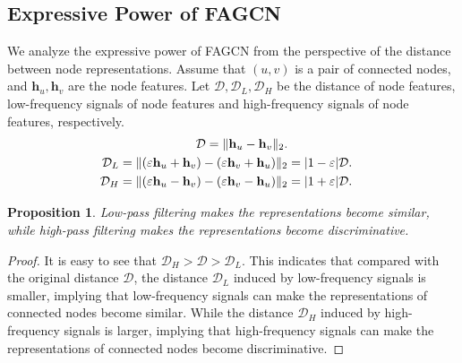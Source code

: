 \documentclass[letterpaper]{article} %
\newtheorem{proposition}{Proposition}
\begin{document}
\subsection{Expressive Power of FAGCN}
\label{sec:expressive}

We analyze the expressive power of FAGCN from the perspective of the distance between node representations.
Assume that $(u, v)$ is a pair of connected nodes, and $\mathbf{h}_{u}, \mathbf{h}_{v}$ are the node features. Let $\mathcal{D}, \mathcal{D}_{L}, \mathcal{D}_{H}$ be the distance of node features, low-frequency signals of node features and high-frequency signals of node features, respectively.
\begin{align}
	\mathcal{D} = \| \mathbf{h}_{u}-\mathbf{h}_{v} \|_{2}. \notag \\
	\mathcal{D}_{L} = \| (\varepsilon\mathbf{h}_{u}+\mathbf{h}_{v}) - (\varepsilon\mathbf{h}_{v}+\mathbf{h}_{u}) \|_{2} &= | 1-\varepsilon |\mathcal{D}. \notag \\
	\mathcal{D}_{H} = \| (\varepsilon\mathbf{h}_{u}-\mathbf{h}_{v}) - (\varepsilon\mathbf{h}_{v}-\mathbf{h}_{u}) \|_{2} &= | 1+\varepsilon |\mathcal{D}. \notag	
\end{align}


\begin{proposition}
\label{prop1}
	Low-pass filtering makes the representations become similar, while high-pass filtering makes the representations become discriminative.
\end{proposition}

\begin{proof}
	It is easy to see that $\mathcal{D}_{H} > \mathcal{D} > \mathcal{D}_{L}$. 
	This indicates that compared with the original distance $\mathcal{D}$, the distance $\mathcal{D}_{L}$ induced by low-frequency signals is smaller, implying that low-frequency signals can make the representations of connected nodes become similar. 
	While the distance $\mathcal{D}_{H}$ induced by high-frequency signals is larger, implying that high-frequency signals can make the representations of connected nodes become discriminative.
\end{proof}
\end{document}
